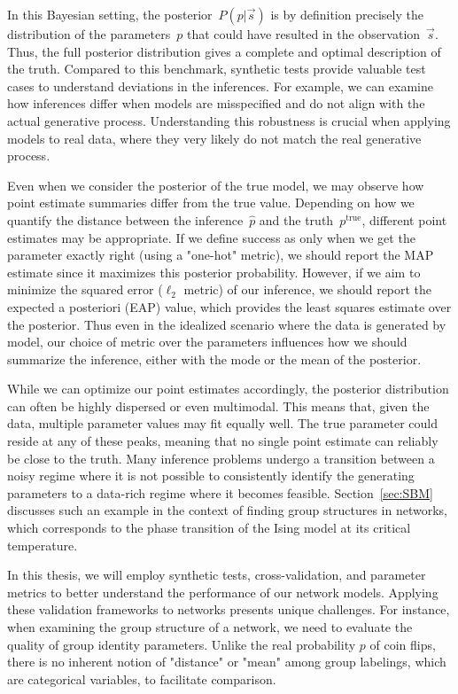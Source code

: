 In this Bayesian setting, the posterior~$P(p|\vec{s})$ is by definition precisely the distribution of the parameters~$p$ that could have resulted in the observation~$\vec{s}$. Thus, the full posterior distribution gives a complete and optimal description of the truth. Compared to this benchmark, synthetic tests provide valuable test cases to understand deviations in the inferences. For example, we can examine how inferences differ when models are misspecified and do not align with the actual generative process. Understanding this robustness is crucial when applying models to real data, where they very likely do not match the real generative process. 

Even when we consider the posterior of the true model, we may observe how point estimate summaries differ from the true value. Depending on how we quantify the distance between the inference~$\hat{p}$ and the truth~$p^{\text{true}}$, different point estimates may be appropriate. If we define success as only when we get the parameter exactly right (using a "one-hot" metric), we should report the MAP estimate since it maximizes this posterior probability. However, if we aim to minimize the squared error ($\ell_2$ metric) of our inference, we should report the expected a posteriori (EAP) value, which provides the least squares estimate over the posterior. Thus even in the idealized scenario where the data is generated by model, our choice of metric over the parameters influences how we should summarize the inference, either with the mode or the mean of the posterior.  

While we can optimize our point estimates accordingly, the posterior distribution can often be highly dispersed or even multimodal. This means that, given the data, multiple parameter values may fit equally well. The true parameter could reside at any of these peaks, meaning that no single point estimate can reliably be close to the truth. Many inference problems undergo a transition between a noisy regime where it is not possible to consistently identify the generating parameters to a data-rich regime where it becomes feasible. Section~\ref{sec:SBM} discusses such an example in the context of finding group structures in networks, which corresponds to the phase transition of the Ising model at its critical temperature.

In this thesis, we will employ synthetic tests, cross-validation, and parameter metrics to better understand the performance of our network models. Applying these validation frameworks to networks presents unique challenges. For instance, when examining the group structure of a network, we need to evaluate the quality of group identity parameters. Unlike the real probability $p$ of coin flips, there is no inherent notion of "distance" or "mean" among group labelings, which are categorical variables, to facilitate comparison.

